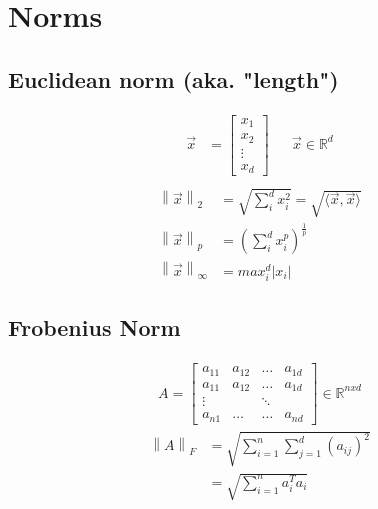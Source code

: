 \documentclass[12pt]{article}
\newcommand{\norm}[1]{\left\lVert#1\right\rVert}
\begin{document}
\section{Norms}
\subsection{Euclidean norm (aka. "length")}
\begin{align*}
    \vec{x} &= \begin{bmatrix} x_1 \\ x_2 \\ \vdots \\ x_d \end{bmatrix} &&     \vec{x}\in \mathbb{R}^d \\
\end{align*}
\begin{align*}
    \norm{\vec{x}}_2 &= \sqrt{\sum_i^d x_i^2} = \sqrt{\langle \vec{x},\vec{x} \rangle} \\
    \norm{\vec{x}}_p &= (\sum_i^d x_i^p)^{\frac{1}{p}}\\
    \norm{\vec{x}}_\infty &= max_i^d \lvert x_i \rvert 
\end{align*}
\subsection{Frobenius Norm}
\begin{align*}
    A = \begin{bmatrix} 
                    a_{11} & a_{12} & \dots & a_{1d} \\
                    a_{11} & a_{12} & \dots & a_{1d} \\
                    \vdots &        & \ddots & \\
                    a_{n1} & \dots  & \dots      & a_{nd} 
    \end{bmatrix} \in \mathbb{R}^{nxd}
\end{align*}
\begin{align*}
    \norm{A}_F &= \sqrt{\sum_{i=1}^{n} \sum_{j=1}^{d} (a_{ij})^2} \\
               &= \sqrt{\sum_{i=1}^{n} a_i^T a_i}    
\end{align*}
\end{document}
